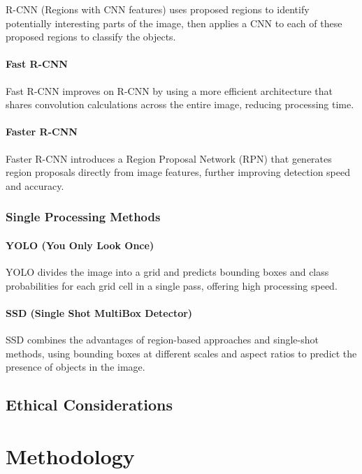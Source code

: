 \documentclass[12pt,oneside]{book} %
\begin{document}
R-CNN (Regions with CNN features) uses proposed regions to identify potentially
interesting parts of the image, then applies a CNN to each of these proposed
regions to classify the objects.

\subsubsection{Fast R-CNN}

Fast R-CNN improves on R-CNN by using a more efficient architecture that shares
convolution calculations across the entire image, reducing processing time.

\subsubsection{Faster R-CNN}

Faster R-CNN introduces a Region Proposal Network (RPN) that generates region
proposals directly from image features, further improving detection speed and
accuracy.

\subsection{Single Processing Methods}

\subsubsection{YOLO (You Only Look Once)}

YOLO divides the image into a grid and predicts bounding boxes and class
probabilities for each grid cell in a single pass, offering high processing
speed.

\subsubsection{SSD (Single Shot MultiBox Detector)}

SSD combines the advantages of region-based approaches and single-shot methods,
using bounding boxes at different scales and aspect ratios to predict the
presence of objects in the image.

\section{Ethical Considerations}

\chapter{Methodology}
\end{document}
